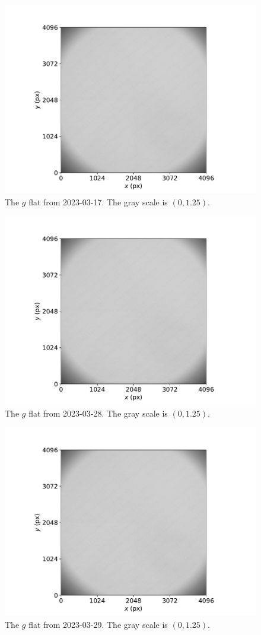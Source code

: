 \documentclass{article}
\begin{document}
\begin{figure}[pb]
\begin{center}
\includegraphics[width=0.7\columnwidth]{figures/flat-g-20230317.pdf}
\medskip
\caption{The $g$ flat from 2023-03-17. The gray scale is $(0,1.25)$.}
\label{figure:flat-g-20230317}
\end{center}
\end{figure}

\begin{figure}[pb]
\begin{center}
\includegraphics[width=0.7\columnwidth]{figures/flat-g-20230328.pdf}
\medskip
\caption{The $g$ flat from 2023-03-28. The gray scale is $(0,1.25)$.}
\label{figure:flat-g-20230328}
\end{center}
\end{figure}

\begin{figure}[pb]
\begin{center}
\includegraphics[width=0.7\columnwidth]{figures/flat-g-20230329.pdf}
\medskip
\caption{The $g$ flat from 2023-03-29. The gray scale is $(0,1.25)$.}
\label{figure:flat-g-20230329}
\end{center}
\end{figure}
\end{document}

